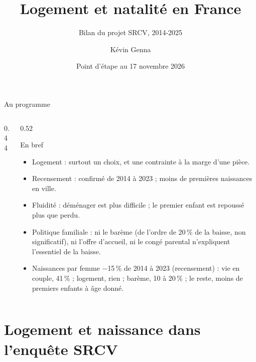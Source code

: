 \documentclass[10pt,aspectratio=169]{beamer}
\title[Logement et natalité]{Logement et natalité en France}
\subtitle{Bilan du projet SRCV, 2014-2025}
\author[Kévin Genna]{Kévin Genna}
\institute[Chaire TDTE]{Chaire Transitions Démographiques, Transitions Économiques}
\date[17 novembre 2026]{Point d'étape au 17 novembre 2026}
\begin{document}
{
\begin{frame}[noframenumbering]
  \titlepage
\end{frame}}

\begin{frame}{Au programme}
  \begin{columns}[T]
    \begin{column}{0.44\textwidth}
      \footnotesize\tableofcontents[hideallsubsections]
    \end{column}
    \begin{column}{0.52\textwidth}
      \begin{callout}{En bref}
        \footnotesize
        \begin{itemize}\setlength{\itemsep}{2pt}
          \item Logement : surtout un choix, et une contrainte à la marge d'une pièce.
          \item Recensement : confirmé de 2014 à 2023 ; moins de premières naissances en ville.
          \item Fluidité : déménager est plus difficile ; le premier enfant est repoussé plus que perdu.
          \item Politique familiale : ni le barème (de l'ordre de 20\,\% de la baisse, non significatif), ni l'offre d'accueil, ni le congé parental n'expliquent l'essentiel de la baisse.
          \item Naissances par femme $-$15\,\% de 2014 à 2023 (recensement) : vie en couple, 41\,\% ; logement, rien ; barème, 10 à 20\,\% ; le reste, moins de premiers enfants à âge donné.
        \end{itemize}
      \end{callout}
    \end{column}
  \end{columns}
\end{frame}

\section{Logement et naissance dans l'enquête SRCV}
\end{document}
